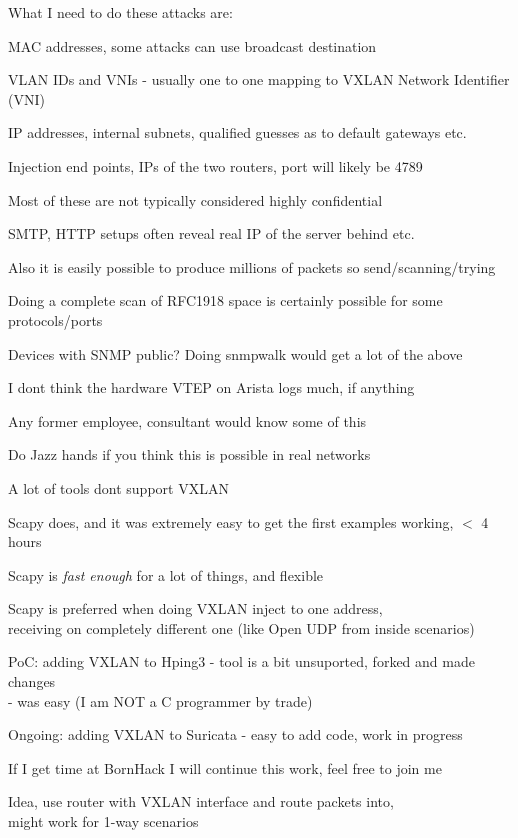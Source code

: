 \documentclass[16pt,landscape,a4paper,footrule]{foils}
\begin{document}
What I need to do these attacks are:
\begin{list2}
\item MAC addresses, some attacks can use broadcast destination
\item VLAN IDs and VNIs - usually one to one mapping to VXLAN Network Identifier (VNI)
\item IP addresses, internal subnets, qualified guesses as to default gateways etc.
\item Injection end points, IPs of the two routers, port will likely be 4789
\item Most of these are not typically considered highly confidential
\item SMTP, HTTP setups often reveal real IP of the server behind etc.
\item Also it is easily possible to produce millions of packets so send/scanning/trying
\item Doing a complete scan of RFC1918 space is certainly possible for some protocols/ports
\item Devices with SNMP public? Doing snmpwalk would get a lot of the above
\item I dont think the hardware VTEP on Arista logs much, if anything
\end{list2}

\vskip 1cm
Any former employee, consultant would know some of this

Do Jazz hands if you think this is possible in real networks


\begin{list2}
\item A lot of tools dont support VXLAN
\item Scapy does, and it was extremely easy to get the first examples working, $<$ 4 hours
\item Scapy is \emph{fast enough} for a lot of things, and flexible
\item Scapy is preferred when doing VXLAN inject to one address, \\
receiving on completely different one (like Open UDP from inside scenarios)
\item PoC: adding VXLAN to Hping3 - tool is a bit unsuported, forked and made changes\\
- was easy (I am NOT a C programmer by trade)
\item Ongoing: adding VXLAN to Suricata - easy to add code, work in progress
\item If I get time at BornHack I will continue this work, feel free to join me
\item Idea, use router with VXLAN interface and route packets into,\\ might work for 1-way scenarios
\end{list2}
\end{document}
